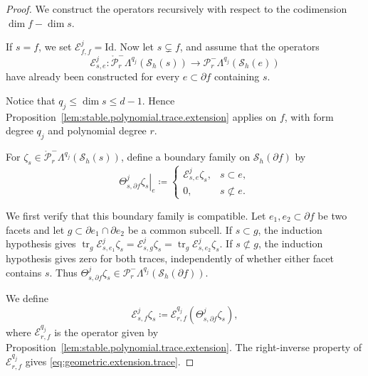 \documentclass[a4paper,11pt]{article}
\theoremstyle{definition}
\newcommand{\Sh}{\mathcal{S}_h}
\newcommand{\PLtrim}[2]{\mathcal{P}_{#1}^{-}\Lambda^{#2}}
\newcommand{\trc}{\operatorname{tr}}
\newcommand{\PLtrimz}[2]{\mathring{\mathcal P}_{#1}^{-}\Lambda^{#2}}
\begin{document}
\begin{proof}
We construct the operators recursively with respect to the codimension $\dim f-\dim s$.

If $s=f$, we set $\mathcal E_{f,f}^j=\mathrm{Id}$.
Now let $s\subsetneq f$, and assume that the operators
\[
  \mathcal E_{s,e}^j\colon
  \PLtrimz{r}{q_j}(\Sh(s))
  \longrightarrow
  \PLtrim{r}{q_j}(\Sh(e))
\]
have already been constructed for every $e\subset\partial f$ containing $s$.

Notice that $q_j\leq\dim s\leq d-1$.
Hence Proposition~\ref{lem:stable.polynomial.trace.extension} applies on $f$, with form degree $q_j$ and polynomial degree $r$.

For $\zeta_s\in\PLtrimz{r}{q_j}(\Sh(s))$, define a boundary family on $\Sh(\partial f)$ by
\[
  \left.
  \Theta_{s,\partial f}^j\zeta_s
  \right|_e
  \coloneqq
  \begin{cases}
    \mathcal E_{s,e}^j\zeta_s,
    &s\subset e,
    \\[1mm]
    0,
    &s\not\subset e.
  \end{cases}
\]

We first verify that this boundary family is compatible.
Let $e_1,e_2\subset\partial f$ be two facets and let $g\subset\partial e_1\cap\partial e_2$ be a common subcell.
If $s\subset g$, the induction hypothesis gives $\trc_g \mathcal E_{s,e_1}^j\zeta_s = \mathcal E_{s,g}^j\zeta_s = \trc_g \mathcal E_{s,e_2}^j\zeta_s$.
If $s\not\subset g$, the induction hypothesis gives zero for both traces, independently of whether either facet contains $s$.
Thus $\Theta_{s,\partial f}^j\zeta_s \in \PLtrim{r}{q_j}(\Sh(\partial f))$.

We define
\begin{equation}\label{eq:geometric.extension.definition}
\mathcal E_{s,f}^j\zeta_s
\coloneqq
\mathcal E_{r,f}^{q_j}
\left(
\Theta_{s,\partial f}^j\zeta_s
\right),
\end{equation}
where $\mathcal E_{r,f}^{q_j}$ is the operator given by Proposition~\ref{lem:stable.polynomial.trace.extension}.
The right-inverse property of $\mathcal E_{r,f}^{q_j}$ gives \eqref{eq:geometric.extension.trace}.


\end{proof}
\end{document}
